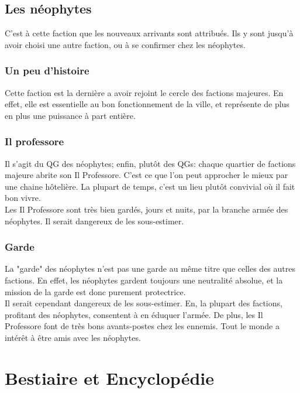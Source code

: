 \documentclass{book}
\begin{document}
\hypertarget{neophytes}{\section{Les néophytes}}
C'est à cette faction que les nouveaux arrivants sont attribués. Ils y sont jusqu'à avoir choisi une autre faction, ou à se confirmer chez les néophytes.
\subsection{Un peu d'histoire}
Cette faction est la dernière a avoir rejoint le cercle des factions majeures. En effet, elle est essentielle au bon fonctionnement de la ville, et représente de plus en plus une puissance à part entière.
\subsection{Il professore}
Il s'agit du QG des néophytes; enfin, plutôt des QGs: chaque quartier de factions majeure abrite son Il Professore. C'est ce que l'on peut approcher le mieux par une chaine hôtelière. La plupart de temps, c'est un lieu plutôt convivial où il fait bon vivre. 
\\
Les Il Professore sont très bien gardés, jours et nuits, par la branche armée des néophytes. Il serait dangereux de les sous-estimer.

\subsection{Garde}
La "garde" des néophytes n'est pas une garde au même titre que celles des autres factions. En effet, les néophytes gardent toujours une neutralité absolue, et la mission de la garde est donc purement protectrice.
\\
Il serait cependant dangereux de les sous-estimer. En, la plupart des factions, profitant des néophytes, consentent à en éduquer l'armée. De plus, les Il Professore font de très bons avants-postes chez les ennemis. Tout le monde a intérêt à être amis avec les néophytes.

\chapter{Bestiaire et Encyclopédie}
\end{document}
